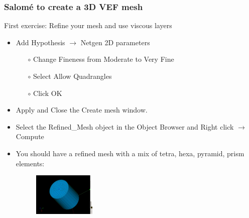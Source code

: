 \documentclass[10pt]{beamer}
\begin{document}
\begin{frame}
\frametitle{Salom\'e to create a 3D VEF mesh}
\begin{block}{First exercise: Refine your mesh and use viscous layers}

\begin{itemize}
\item Add Hypothesis $\rightarrow$ Netgen 2D parameters
    \begin{itemize}
    \item [$\circ$] Change Fineness from Moderate to Very Fine
    \item [$\circ$] Select Allow Quadrangles
    \item [$\circ$] Click OK
    \end{itemize}
\item Apply and Close the Create mesh window.
\item Select the Refined\_Mesh object in the Object Browser and Right click $\rightarrow$ Compute
\item You should have a refined mesh with a mix of tetra, hexa, pyramid, prism elements:

\begin{figure}
\includegraphics[width=0.28\textwidth]{PICTURES/salome6.jpg}
\end{figure}

\end{itemize}

\end{block}
\end{frame}
\end{document}
